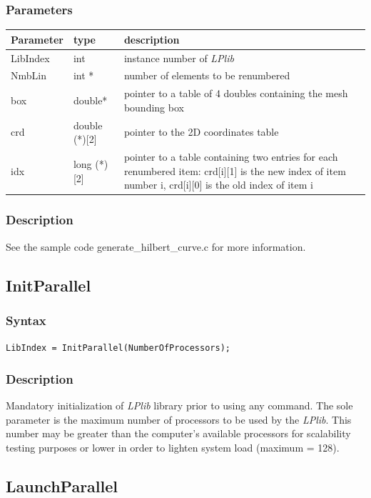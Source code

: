 \documentclass[a4paper,12pt]{article}
\begin{document}
\subsubsection*{Parameters}
\begin{tabular}{|m{2cm}|m{3cm}|m{8cm}|}
\hline
Parameter  & type   & description \\
\hline
LibIndex   & int    & instance number of \emph{LPlib} \\
\hline
NmbLin     & int * & number of elements to be renumbered \\
\hline
box        & double* & pointer to a table of 4 doubles containing the mesh bounding box \\
\hline
crd        & double (*)[2] & pointer to the 2D coordinates table \\
\hline
idx        & long (*)[2] & pointer to a table containing two entries for each renumbered item: crd[i][1] is the new index of item number i, crd[i][0] is the old index of item i \\
\hline
\end{tabular}

\subsubsection*{Description}
See the sample code generate\_hilbert\_curve.c for more information.


\subsection{InitParallel}

\subsubsection*{Syntax}
\tt{LibIndex = InitParallel(NumberOfProcessors);}
\normalfont

\subsubsection*{Description}
Mandatory initialization of \emph{LPlib} library prior to using any command. The sole parameter is the maximum number of processors to be used by the \emph{LPlib}. This number may be greater than the computer's available processors for scalability testing purposes or lower in order to lighten system load (maximum = 128).


\subsection{LaunchParallel}
\end{document}
